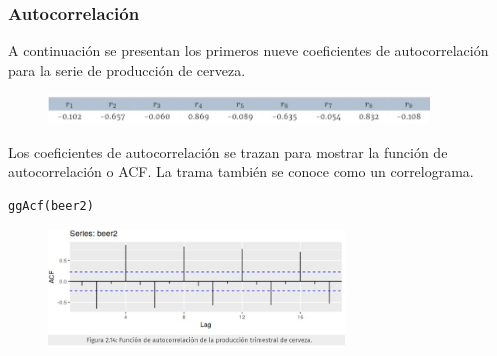 \documentclass[10pt]{beamer}
\begin{document}
\begin{frame}[fragile]
\frametitle{Autocorrelación}


A continuación se presentan los primeros nueve coeficientes de autocorrelación para la serie de producción de cerveza.

\vspace{4mm}


\begin{figure}
\begin{center}
    \includegraphics[width=0.9\textwidth]{Imagen28.JPG}
\end{center}
\end{figure}


Los coeficientes de autocorrelación se trazan para mostrar la función de autocorrelación o ACF. La trama también se conoce como un correlograma.

\lstset{language=r,label= ,caption= ,captionpos=b,numbers=none}
\begin{lstlisting}
ggAcf(beer2)
\end{lstlisting}

\pause
\begin{figure}
\begin{center}
    \includegraphics[width=0.7\textwidth]{Imagen29.JPG}
\end{center}
\end{figure}


\end{frame}


\end{document}
